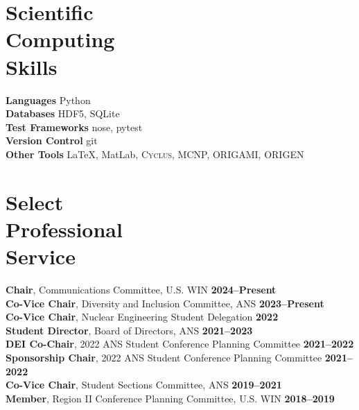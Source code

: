 \documentclass[margin,line]{resume}
\newcommand{\Cyclus}{\textsc{Cyclus}\xspace}%
\begin{document}
\begin{resume}
    \section{\mysidestyle Scientific\\Computing\\Skills}
                \textbf{Languages} \hfill Python\vspace{.5mm}\\%
                \textbf{Databases} \hfill HDF5, SQLite\vspace{.5mm}\\%
                \textbf{Test Frameworks} \hfill nose, pytest\vspace{.5mm}\\%
                \textbf{Version Control} \hfill git\vspace{.5mm}\\%
                \textbf{Other Tools} \hfill \LaTeX, MatLab, \Cyclus, MCNP, ORIGAMI, ORIGEN\vspace{.5mm}%
        \vspace{-5mm}

    \section{\mysidestyle Select\\Professional\\Service}
        \textbf{Chair}, Communications Committee, U.S. WIN  \hfill \textbf{2024--Present}\\%
        \textbf{Co-Vice Chair}, Diversity and Inclusion Committee, ANS  \hfill \textbf{2023--Present}\vspace{.5mm}\\%
        \textbf{Co-Vice Chair}, Nuclear Engineering Student Delegation \hfill\textbf{2022}\\
        \textbf{Student Director}, Board of Directors, ANS \hfill \textbf{2021--2023}\vspace{.5mm}\\%
        \textbf{DEI Co-Chair}, 2022 ANS Student Conference Planning Committee \hfill \textbf{2021--2022}\vspace{.5mm}\\%
        \textbf{Sponsorship Chair}, 2022 ANS Student Conference Planning Committee \hfill \textbf{2021--2022}\vspace{.5mm}\\%
        \textbf{Co-Vice Chair}, Student Sections Committee, ANS \hfill \textbf{2019--2021}\\
        \textbf{Member}, Region II Conference Planning Committee, U.S. WIN  \hfill \textbf{2018--2019}\vspace{0mm}\\%



\end{resume}
\end{document}
